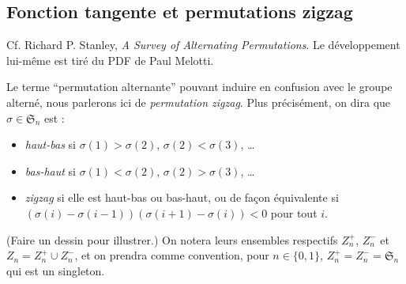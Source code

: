 \documentclass[a4paper, 11pt]{article}
\def\R{\mathbb{R}}
\def\M{\mathcal{M}}
\def\Tr{\textnormal{Tr}}
\def\Sigmap{\mathfrak{S}}
\newtheorem*{theorem}{Théorème}
\begin{document}




\newpage



\subsection{Fonction tangente et permutations zigzag}

Cf. Richard P. Stanley, \emph{A Survey of Alternating Permutations}. Le
développement lui-même est tiré du PDF de Paul Melotti.

Le terme \enquote{permutation alternante} pouvant induire en confusion avec le
groupe alterné, nous parlerons ici de \emph{permutation zigzag}. Plus
précisément, on dira que $\sigma \in \Sigmap_n$ est :
\begin{itemize}
\item \emph{haut-bas} si $\sigma(1) > \sigma(2)$, $\sigma(2) < \sigma(3)$,
  \ldots
\item \emph{bas-haut} si $\sigma(1) < \sigma(2)$, $\sigma(2) > \sigma(3)$,
  \ldots
\item \emph{zigzag} si elle est haut-bas ou bas-haut, ou de façon équivalente si
  $(\sigma(i) - \sigma(i-1))(\sigma(i+1) - \sigma(i)) < 0$ pour tout $i$.
\end{itemize}
(Faire un dessin pour illustrer.) On notera leurs ensembles respectifs $Z_n^+$,
$Z_n^-$ et $Z_n = Z_n^+ \cup Z_n^-$, et on prendra comme convention, pour $n \in
\{0,1\}$, $Z_n^+ = Z_n^- = \Sigmap_n$ qui est un singleton.
\end{document}
